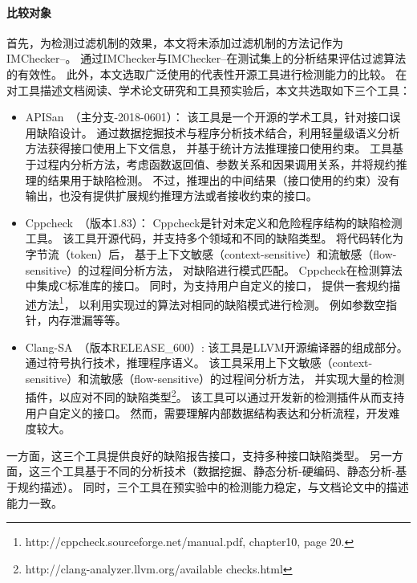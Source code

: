 \paragraph{比较对象}
首先，为检测过滤机制的效果，本文将未添加过滤机制的方法记作为IMChecker--。
通过IMChecker与IMChecker--在测试集上的分析结果评估过滤算法的有效性。
此外，本文选取广泛使用的代表性开源工具进行检测能力的比较。
在对工具描述文档阅读、学术论文研究和工具预实验后，本文共选取如下三个工具：
\begin{itemize}
	\item APISan~\cite{16-sec-apisan}（主分支-2018-0601）：
	该工具是一个开源的学术工具，针对接口误用缺陷设计。
	通过数据挖掘技术与程序分析技术结合，利用轻量级语义分析方法获得接口使用上下文信息，
	并基于统计方法推理接口使用约束。
	工具基于过程内分析方法，考虑函数返回值、参数关系和因果调用关系，并将规约推理的结果用于缺陷检测。
	不过，推理出的中间结果（接口使用的约束）没有输出，也没有提供扩展规约推理方法或者接收约束的接口。
	\item Cppcheck~\cite{cppcheck}（版本1.83）：
	Cppcheck是针对未定义和危险程序结构的缺陷检测工具。
	该工具开源代码，并支持多个领域和不同的缺陷类型。
	将代码转化为字节流（token）后，
	基于上下文敏感（context-sensitive）和流敏感（flow-sensitive）的过程间分析方法，
	对缺陷进行模式匹配。
	Cppcheck在检测算法中集成C标准库的接口。
	同时，为支持用户自定义的接口，
	提供一套规约描述方法\footnote{http://cppcheck.sourceforge.net/manual.pdf, chapter10, page 20.}，
	以利用实现过的算法对相同的缺陷模式进行检测。
	例如参数空指针，内存泄漏等等。
	\item Clang-SA~\cite{clang-sa}（版本RELEASE\_600）:
	该工具是LLVM开源编译器的组成部分。
	通过符号执行技术，推理程序语义。
	该工具采用上下文敏感（context-sensitive）和流敏感（flow-sensitive）的过程间分析方法，
	并实现大量的检测插件，以应对不同的缺陷类型\footnote{http://clang-analyzer.llvm.org/available checks.html}。
	该工具可以通过开发新的检测插件从而支持用户自定义的接口。
	然而，需要理解内部数据结构表达和分析流程，开发难度较大。
\end{itemize} 
一方面，这三个工具提供良好的缺陷报告接口，支持多种接口缺陷类型。
另一方面，这三个工具基于不同的分析技术（数据挖掘、静态分析-硬编码、静态分析-基于规约描述）。
同时，三个工具在预实验中的检测能力稳定，与文档论文中的描述能力一致。

